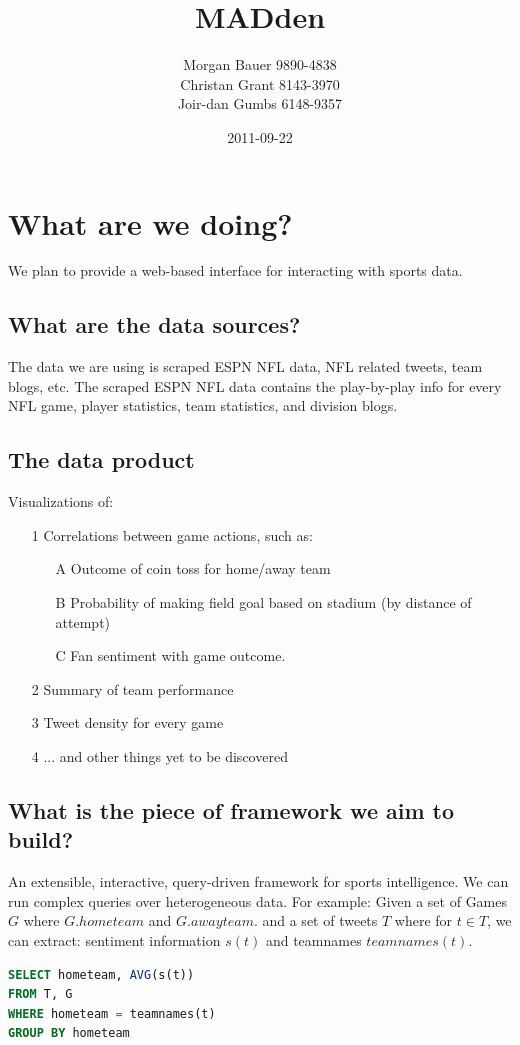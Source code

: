 \documentclass{article}
\title{MADden}
\author{Morgan Bauer 9890-4838 \\
         Christan Grant 8143-3970 \\
         Joir-dan Gumbs 6148-9357}
\date{2011-09-22}
\begin{document}
	\maketitle
	\section{What are we doing?}
	We plan to provide a web-based interface for interacting with
	sports data.
	\subsection{What are \textbf{the} data sources?}
	The data we are using is scraped ESPN NFL data, NFL related 
	tweets, team blogs, etc. The scraped ESPN NFL data contains the
	play-by-play info for every NFL game, player statistics, team
	statistics, and division blogs.
	\subsection{The data product}
	Visualizations of:
	\begin{enumerate}
		\item[1] Correlations between game actions, such as:
		\begin{enumerate}
			\item[A] Outcome of coin toss for home/away team
			\item[B] Probability of making field goal based on
			         stadium (by distance of attempt)
			\item[C] Fan sentiment with game outcome.
		\end{enumerate}
		\item[2] Summary of team performance
		\item[3] Tweet density for every game
		\item[4] ... and other things yet to be discovered
	\end{enumerate}
	\subsection{What is the piece of framework we aim to build?}
	An extensible, interactive, query-driven framework for sports
	intelligence. We can run complex queries over heterogeneous data.
	For example:
		Given a set of Games $G$ where $G.hometeam$ and $G.awayteam$.
		and  a set of tweets $T$ where 
			for $t \in T$, 
				we can extract: 
					sentiment information $s(t)$ and teamnames $teamnames(t)$.
 
		
\lstset{frame=single }
\lstset{basicstyle=\footnotesize}
\begin{lstlisting}[language=SQL]
SELECT hometeam, AVG(s(t))
FROM T, G
WHERE hometeam = teamnames(t)
GROUP BY hometeam
\end{lstlisting}
\end{document}
